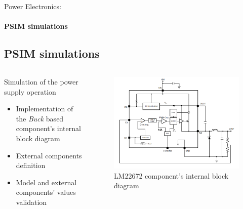 \documentclass{beamer}
\begin{document}
	\begin{frame}{Power Electronics:}
		\framesubtitle{PSIM simulations}
		\subsection[Simulations]{PSIM simulations}
		\begin{columns}[T]
	  		\begin{column}{0.5\textwidth}
				Simulation of the power supply operation 
				\begin{itemize}
					\item Implementation of the \textit{Buck} based component's internal block diagram
					\item External components definition
					\item Model and external components' values validation
				\end{itemize}
	  		\end{column}
	  		\begin{column}{0.5\textwidth}
	  			\begin{figure}
	  				\begin{center}
	  					\includegraphics[height=0.5\textheight]{../Illus/func_bloc_lm22672.png}
	  				\end{center}
	    			\caption{LM22672 component's internal block diagram}
	    		\end{figure}
	  		\end{column}
		\end{columns}
	\end{frame}
	
\end{document}

